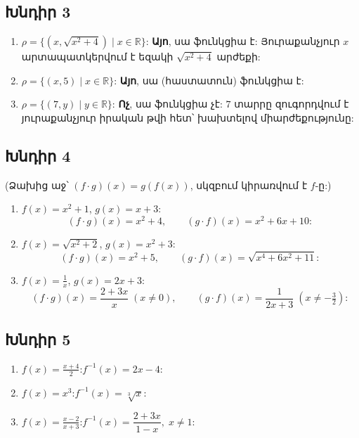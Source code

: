 \subsection*{Խնդիր 3}
\begin{enumerate}[label=(\alph*), nosep]
  \item $\rho = \{(x,\sqrt{x^2+4}) \mid x\in\mathbb{R}\}$: \textbf{Այո}, սա ֆունկցիա է: Յուրաքանչյուր $x$ արտապատկերվում է եզակի $\sqrt{x^2+4}$ արժեքի:
  \item $\rho = \{(x,5) \mid x\in\mathbb{R}\}$: \textbf{Այո}, սա (հաստատուն) ֆունկցիա է:
  \item $\rho = \{(7,y) \mid y\in\mathbb{R}\}$: \textbf{Ոչ}, սա ֆունկցիա չէ: $7$ տարրը զուգորդվում է յուրաքանչյուր իրական թվի հետ՝ խախտելով միարժեքությունը:
\end{enumerate}

\subsection*{Խնդիր 4}
(Ձախից աջ՝ $(f\cdot g)(x)=g(f(x))$, սկզբում կիրառվում է $f$-ը:)
\begin{enumerate}[label=(\alph*), nosep]
  \item $f(x)=x^2+1$, $g(x)=x+3$:
    \[
      (f\cdot g)(x) = x^2+4, \qquad (g\cdot f)(x) = x^2+6x+10:
    \]
  \item $f(x)=\sqrt{x^2+2}$, $g(x)=x^2+3$:
    \[
      (f\cdot g)(x) = x^2+5, \qquad (g\cdot f)(x) = \sqrt{x^4+6x^2+11}:
    \]
  \item $f(x)=\frac{1}{x}$, $g(x)=2x+3$:
    \[
      (f\cdot g)(x) = \frac{2+3x}{x}\;(x\neq 0), \qquad (g\cdot f)(x) = \frac{1}{2x+3}\;(x\neq -\tfrac{3}{2}):
    \]
\end{enumerate}

\subsection*{Խնդիր 5}
\begin{enumerate}[label=(\alph*), nosep]
  \item $f(x)=\frac{x+4}{2}$:\quad $f^{-1}(x)=2x-4$:
  \item $f(x)=x^3$:\quad $f^{-1}(x)=\sqrt[3]{x}$:
  \item $f(x)=\frac{x-2}{x+3}$:\quad $f^{-1}(x)=\dfrac{2+3x}{1-x},\; x\neq 1$:
\end{enumerate}

